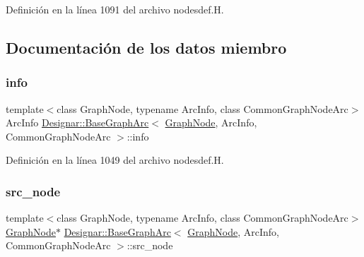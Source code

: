 Definición en la línea 1091 del archivo nodesdef.\+H.



\subsection{Documentación de los datos miembro}
\mbox{\label{class_designar_1_1_base_graph_arc_a8aacc596a2fbca49cc927d6eaac595aa}} 
\subsubsection{\texorpdfstring{info}{info}}
{\footnotesize\ttfamily template$<$class Graph\+Node, typename Arc\+Info, class Common\+Graph\+Node\+Arc$>$ \\
Arc\+Info \hyperlink{class_designar_1_1_base_graph_arc}{Designar\+::\+Base\+Graph\+Arc}$<$ \hyperlink{class_designar_1_1_graph_node}{Graph\+Node}, Arc\+Info, Common\+Graph\+Node\+Arc $>$\+::info\hspace{0.3cm}{\ttfamily [protected]}}



Definición en la línea 1049 del archivo nodesdef.\+H.

\mbox{\label{class_designar_1_1_base_graph_arc_a3d62765087127c26045bfae7a3c5f6f8}} 
\subsubsection{\texorpdfstring{src\+\_\+node}{src\_node}}
{\footnotesize\ttfamily template$<$class Graph\+Node, typename Arc\+Info, class Common\+Graph\+Node\+Arc$>$ \\
\hyperlink{class_designar_1_1_graph_node}{Graph\+Node}$\ast$ \hyperlink{class_designar_1_1_base_graph_arc}{Designar\+::\+Base\+Graph\+Arc}$<$ \hyperlink{class_designar_1_1_graph_node}{Graph\+Node}, Arc\+Info, Common\+Graph\+Node\+Arc $>$\+::src\+\_\+node\hspace{0.3cm}{\ttfamily [protected]}}



